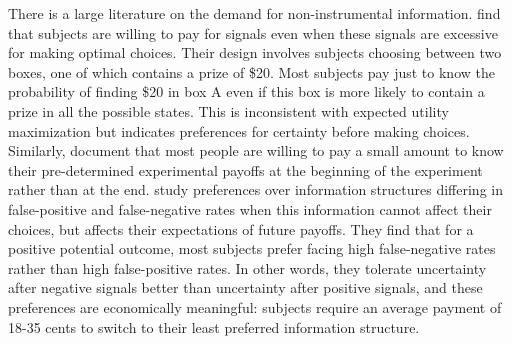 \documentclass[12pt,a4paper]{article}
\begin{document}
There is a large literature on the demand for non-instrumental information. \citet{eliaz_paying_2010} find that subjects are willing to pay for signals even when these signals are excessive for making optimal choices. Their design involves subjects choosing between two boxes, one of which contains a prize of \$20. Most subjects pay just to know the probability of finding \$20 in box A even if this box is more likely to contain a prize in all the possible states. This is inconsistent with expected utility maximization but indicates preferences for certainty before making choices.  Similarly, \citet{ganguly_fantasy_2017} document that most people are willing to pay a small amount to know their pre-determined experimental payoffs at the beginning of the experiment rather than at the end.  \citet{masatlioglu_intrinsic_2017} study preferences over information structures differing in false-positive and false-negative rates when this information cannot affect their choices, but affects their expectations of future payoffs. They find that for a positive potential outcome, most subjects prefer facing high false-negative rates rather than high false-positive rates. In other words, they tolerate uncertainty after negative signals better than uncertainty after positive signals, and these preferences are economically meaningful: subjects require an average payment of 18-35 cents to switch to their least preferred information structure.

\end{document}
